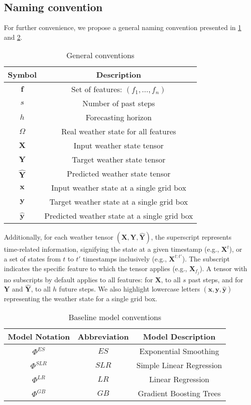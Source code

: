 \subsection{Naming convention}
 For further convenience, we propose a general naming convention presented in \ref{tab:name_conv} and \ref{tab:model_conv}. 
 \begin{table}[!ht]
    \centering
     \begin{tabular}{|c|c|}
        \hline
        Symbol & Description \\
        \hline
        $\mathbf{f}$ & Set of features: $(f_1,..., f_n)$ \\
        $s$ & Number of past steps \\
        $h$ & Forecasting horizon \\
        $\Omega$ & Real weather state for all features \\
        $\mathbf{X}$ & Input weather state tensor  \\
        $\mathbf{Y}$ & Target weather state tensor  \\
        $\hat{\mathbf{Y}}$ & Predicted weather state tensor \\
        $\mathbf{x}$ & Input weather state at a single grid box \\
        $\mathbf{y}$ & Target weather state at a single grid box \\
        $\hat{\mathbf{y}}$ & Predicted weather state at a single grid box \\
        \hline
    \end{tabular}
    \caption{General conventions}
    \label{tab:name_conv}
 \end{table}

Additionally, for each weather tensor $(\mathbf{X}, \mathbf{Y}, \hat{\mathbf{Y}})$, the superscript represents time-related information, signifying the state at a given timestamp (e.g., $\mathbf{X}^t$), or a set of states from $t$ to $t'$ timestamps inclusively (e.g., $\mathbf{X}^{t:t'}$). The subscript indicates the specific feature to which the tensor applies (e.g., $\mathbf{X}_{f_j}$). A tensor with no subscripts by default applies to all features: for $\mathbf{X}$, to all $s$ past steps, and for $\mathbf{Y}$ and $\hat{\mathbf{Y}}$, to all $h$ future steps. We also highlight lowercase letters $(\mathbf{x},\mathbf{y},\hat{\mathbf{y}})$ representing the weather state for a single grid box.
 
\begin{table}[!ht]
    \centering
    \begin{tabular}{|c|c|c|}
        \hline
        Model Notation & Abbreviation & Model Description \\
        \hline
        $\Phi^{ES}$  & $ES$ & Exponential Smoothing \\
        $\Phi^{SLR}$ & $SLR$ & Simple Linear Regression \\
        $\Phi^{LR}$  & $LR$ & Linear Regression \\
        $\Phi^{GB}$ & $GB$ & Gradient Boosting Trees \\
        \hline
    \end{tabular}
\caption{Baseline model conventions}
\label{tab:model_conv}
\end{table}
 
